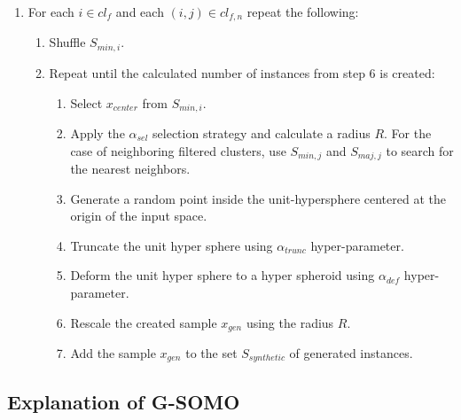 \documentclass[parskip=full]{scrartcl}
\begin{document}
\begin{algorithm}[H]
\begin{enumerate}
		\item For each $i \in cl_{f}$ and each $(i, j) \in cl_{f, n}$ repeat the following:
		
			\begin{enumerate}[label*=\arabic*.]
		
			\item Shuffle $S_{min, i}$. 
		
			\item Repeat until the calculated number of instances from step 6 is created:
				  
				\begin{enumerate}[label*=\arabic*.]

				\item Select $x_{center}$ from $S_{min, i}$.
				
				\item Apply the $\alpha_{sel}$ selection strategy and calculate
					  a radius $R$. For the case of neighboring filtered
					  clusters, use $S_{min, j}$ and $S_{maj, j}$ to search for
					  the nearest neighbors.
				
				\item Generate a random point inside the unit-hypersphere
					  centered at the origin of the input space.
				
				\item Truncate the unit hyper sphere using $\alpha_{trunc}$
					  hyper-parameter.
				
				\item Deform the unit hyper sphere to a hyper spheroid using
					  $\alpha_{def}$ hyper-parameter.
				
				\item Rescale the created sample $x_{gen}$ using the radius $R$.
				
				\item Add the sample $x_{gen}$ to the set $S_{synthetic}$ of
					  generated instances.

				\end{enumerate}

			\end{enumerate}

	\end{enumerate}


\end{algorithm}

\subsection{Explanation of G-SOMO}
\end{document}
